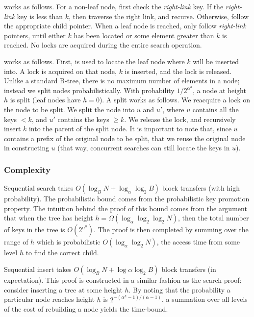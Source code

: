 \documentclass{style}
\begin{document}
\Search{} works as follows. For a non-leaf node, first check the
\textit{right-link} key. If the \textit{right-link} key is less than $k$, then
traverse the right link, and recurse. Otherwise, follow the appropriate child
pointer. When a leaf node is reached, only follow \textit{right-link}
pointers, until either $k$ has been located or some element greater than $k$
is reached. No locks are acquired during the entire search operation.

\Insert{} works as follows. First, \Search{} is used to locate the leaf node
where $k$ will be inserted into. A lock is acquired on that node, $k$ is
inserted, and the lock is released. Unlike a standard B-tree, there is no
maximum number of elements in a node; instead we split nodes
probabilistically. With probability ${1}/{2^{\alpha^h}}$, a node at height $h$
is split (leaf nodes have $h = 0$). A split works as follows. We reacquire a
lock on the node to be split. We split the node into $u$ and $u'$, where $u$
contains all the keys $< k$, and $u'$ contains the keys $\geq k$. We release
the lock, and recursively insert $k$ into the parent of the split node. It is
important to note that, since $u$ contains a prefix of the original node to be
split, that we reuse the original node in constructing $u$ (that way,
concurrent searches can still locate the keys in $u$).


\subsubsection{Complexity}

Sequential search takes $O(\log_B{N} + \log_{\alpha}{\log_2{B}})$ block
transfers (with high probability). The probabilistic bound comes from the
probabilistic key promotion property. The intuition behind the proof of this
bound comes from the argument that when the tree has height $h =
\Omega(\log_{\alpha}{\log_2{\log_2{N}}})$, then the total number of keys in
the tree is $O(2^{\alpha^h})$. The proof is then completed by summing over the
range of $h$ which is probabilistic $O(\log_{\alpha}{\log_2{N}})$, the access
time from some level $h$ to find the correct child.

Sequential insert takes $O(\log_B{N} + \log{\alpha}{\log_2{B}})$ block
transfers (in expectation). This proof is constructed in a similar fashion as
the search proof: consider inserting a tree at some height $h$. By noting that
the probability a particular node reaches height $h$ is
$2^{-(\alpha^h-1)/(\alpha-1)}$, a summation over all levels of the cost of
rebuilding a node yields the time-bound.
\end{document}
